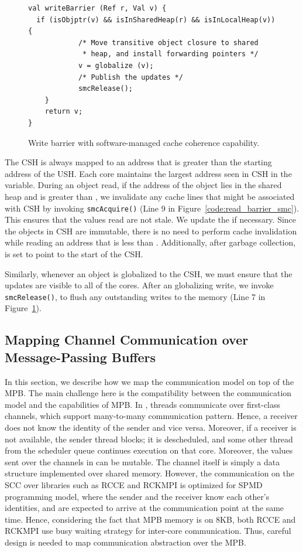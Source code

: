 \begin{figure}[t]
\vspace{10mm}
\begin{lstlisting}
val writeBarrier (Ref r, Val v) {
  if (isObjptr(v) && isInSharedHeap(r) && isInLocalHeap(v)) {
			/* Move transitive object closure to shared
			 * heap, and install forwarding pointers */
			v = globalize (v);
			/* Publish the updates */
			smcRelease();
	}
	return v;
}
\end{lstlisting}
\caption{Write barrier with software-managed cache coherence capability.}
\label{code:write_barrier_smc}
\end{figure}


The CSH is always mapped to an address that is greater than the starting
address of the USH. Each core maintains the largest address seen in CSH in the
 variable. During an object read, if the address of the
object lies in the shared heap and is greater than , we
invalidate any cache lines that might be associated with CSH by invoking
\texttt{smcAcquire()} (Line 9 in Figure~\ref{code:read_barrier_smc}). This
ensures that the values read are not stale. We update the 
if necessary. Since the objects in CSH are immutable, there is no need to
perform cache invalidation while reading an address that is less than
. Additionally, after garbage collection,
 is set to point to the start of the CSH.

Similarly, whenever an object is globalized to the CSH, we must ensure that the
updates are visible to all of the cores. After an globalizing write, we invoke
\texttt{smcRelease()}, to flush any outstanding writes to the memory (Line 7 in
Figure~\ref{code:write_barrier_smc}).

\subsection{Mapping Channel Communication over Message-Passing Buffers}
\label{sec:comm_opt}

In this section, we describe how we map the \MM communication model on top of
the MPB. The main challenge here is the compatibility between the \MM
communication model and the capabilities of MPB. In \MM, threads communicate
over first-class channels, which support many-to-many communication pattern.
Hence, a receiver does not know the identity of the sender and vice versa.
Moreover, if a receiver is not available, the sender thread blocks; it is
descheduled, and some other thread from the scheduler queue continues execution
on that core. Moreover, the values sent over the channels in \MM can be
mutable. The channel itself is simply a data structure implemented over shared
memory. However, the communication on the SCC over libraries such as RCCE and
RCKMPI is optimized for SPMD programming model, where the sender and the
receiver know each other's identities, and are expected to arrive at the
communication point at the same time. Hence, considering the fact that MPB
memory is on 8KB, both RCCE and RCKMPI use busy waiting strategy for inter-core
communication. Thus, careful design is needed to map \MM communication
abstraction over the MPB.

